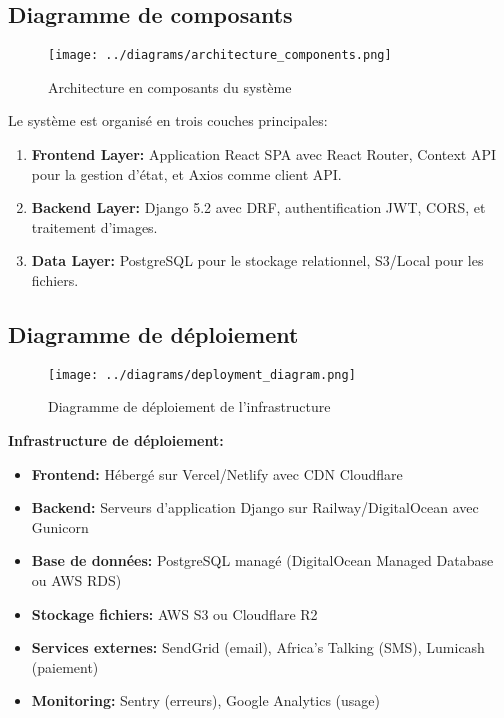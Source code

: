 
\subsection{Diagramme de composants}

\begin{figure}[H]
\centering
\texttt{[image: ../diagrams/architecture\_components.png]}
\caption{Architecture en composants du système}
\label{fig:components}
\end{figure}

Le système est organisé en trois couches principales:
\begin{enumerate}
    \item \textbf{Frontend Layer:} Application React SPA avec React Router, Context API pour la gestion d'état, et Axios comme client API.
    \item \textbf{Backend Layer:} Django 5.2 avec DRF, authentification JWT, CORS, et traitement d'images.
    \item \textbf{Data Layer:} PostgreSQL pour le stockage relationnel, S3/Local pour les fichiers.
\end{enumerate}

\subsection{Diagramme de déploiement}

\begin{figure}[H]
\centering
\texttt{[image: ../diagrams/deployment\_diagram.png]}
\caption{Diagramme de déploiement de l'infrastructure}
\label{fig:deployment}
\end{figure}

\textbf{Infrastructure de déploiement:}
\begin{itemize}
    \item \textbf{Frontend:} Hébergé sur Vercel/Netlify avec CDN Cloudflare
    \item \textbf{Backend:} Serveurs d'application Django sur Railway/DigitalOcean avec Gunicorn
    \item \textbf{Base de données:} PostgreSQL managé (DigitalOcean Managed Database ou AWS RDS)
    \item \textbf{Stockage fichiers:} AWS S3 ou Cloudflare R2
    \item \textbf{Services externes:} SendGrid (email), Africa's Talking (SMS), Lumicash (paiement)
    \item \textbf{Monitoring:} Sentry (erreurs), Google Analytics (usage)
\end{itemize}

